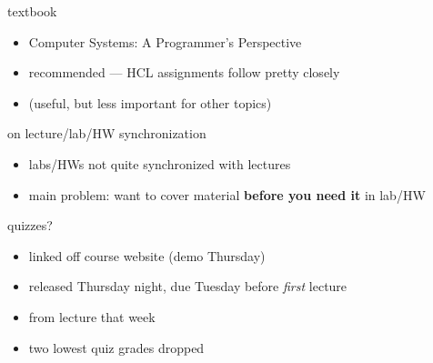 \begin{frame}{textbook}
    \begin{itemize}
    \item Computer Systems: A Programmer's Perspective
    \item recommended --- HCL assignments follow pretty closely
    \item (useful, but less important for other topics)
    \end{itemize}
\end{frame}

\begin{frame}{on lecture/lab/HW synchronization}
    \begin{itemize}
        \item labs/HWs not quite synchronized with lectures
        \item main problem: want to cover material \textbf{before you need it} in lab/HW
    \end{itemize}
\end{frame}


\begin{frame}{quizzes?}
    \begin{itemize}
    \item linked off course website (demo Thursday)
    \item released Thursday night, due Tuesday before \textit{first} lecture
    \item from lecture that week
    \vspace{.5cm}
    \item two lowest quiz grades dropped
    \end{itemize}
\end{frame}

